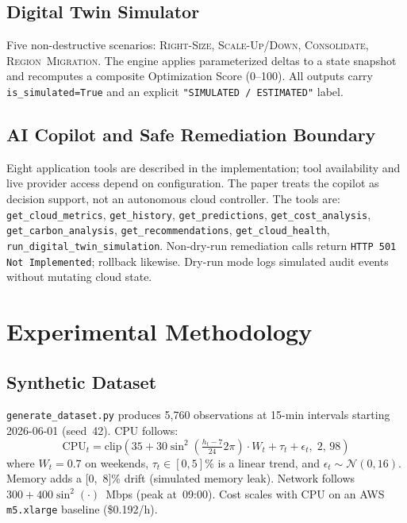 \documentclass[conference]{IEEEtran}
\begin{document}
\subsection{Digital Twin Simulator}
Five non-destructive scenarios: \textsc{Right-Size},
\textsc{Scale-Up/Down}, \textsc{Consolidate}, \textsc{Region~Migration}.
The engine applies parameterized deltas to a state snapshot and
recomputes a composite Optimization Score (0--100). All outputs carry
\texttt{is\_simulated=True} and an explicit
\texttt{"SIMULATED / ESTIMATED"} label.

\subsection{AI Copilot and Safe Remediation Boundary}
Eight application tools are described in the implementation; tool availability and live provider access depend on configuration. The paper treats the copilot as decision support, not an autonomous cloud controller. The tools are: \texttt{get\_cloud\_metrics},
\texttt{get\_history}, \texttt{get\_predictions},
\texttt{get\_cost\_analysis}, \texttt{get\_carbon\_analysis},
\texttt{get\_recommendations}, \texttt{get\_cloud\_health},
\texttt{run\_digital\_twin\_simulation}. Non-dry-run remediation calls
return \texttt{HTTP~501 Not Implemented}; rollback likewise. Dry-run mode
logs simulated audit events without mutating cloud state.

\section{Experimental Methodology}

\subsection{Synthetic Dataset}
\texttt{generate\_dataset.py} produces 5,760 observations at 15-min
intervals starting 2026-06-01 (seed~42). CPU follows:
\begin{equation}
  \text{CPU}_t = \mathrm{clip}\!\left(
    35 + 30\sin^2\!\!\left(\tfrac{h_t-7}{24}2\pi\right)\cdot W_t
    + \tau_t + \epsilon_t,\;2,\,98
  \right)
\end{equation}
where $W_t\!=\!0.7$ on weekends, $\tau_t\!\in\![0,5]\%$ is a linear trend,
and $\epsilon_t\!\sim\!\mathcal{N}(0,16)$.
Memory adds a [0,~8]\% drift (simulated memory leak). Network follows
$300+400\sin^2(\cdot)$~Mbps (peak at~09:00). Cost scales with CPU on an
AWS \texttt{m5.xlarge} baseline (\$0.192/h).
\end{document}
